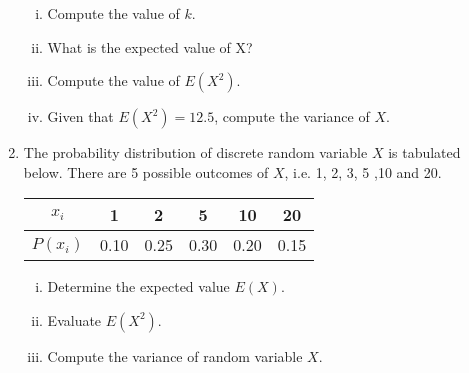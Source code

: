 \documentclass[a4paper,12pt]{article}
\begin{document}
\begin{enumerate}
\begin{enumerate}[(i)]
\item  Compute the value of $k$.
\item  What is the expected value of X?
\item  Compute the value of $E(X^2)$.
\item  Given that $E(X^2) = 12.5$, compute the variance of $X$.
\end{enumerate}
\item 
 The probability distribution of discrete random variable $X$ is tabulated below. There are 5 possible outcomes of $X$, i.e. 1, 2, 3, 5 ,10 and 20.
\begin{center}
\begin{tabular}{|c||c|c|c|c|c|}
\hline
$x_i$  & 1 & 2 & 5 & 10 & 20 \\\hline
$P(x_i)$ &  0.10 & 0.25 & 0.30& 0.20 &0.15\\

\hline
\end{tabular}
\end{center}

\begin{enumerate}[(i)]
\item  Determine the expected value $E(X)$.
\item  Evaluate $E(X^2)$.
\item  Compute the variance of random variable $X$.
\end{enumerate}






    
\end{enumerate}
\end{document}
